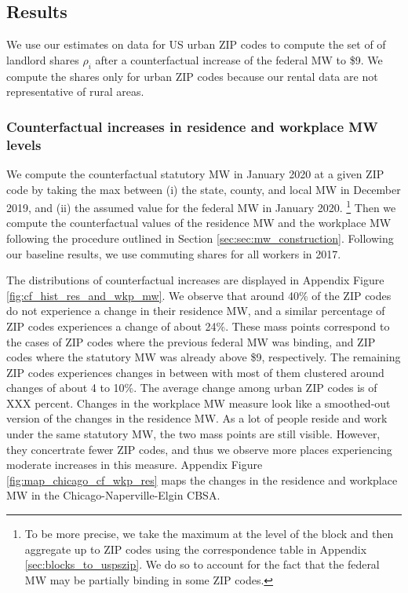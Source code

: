 \subsection{Results}\label{sec:results_cf}

We use our estimates on data for US urban ZIP codes to compute the set of
of landlord shares ${\rho_i}$ after a counterfactual increase of the federal 
MW to \$9.
We compute the shares only for urban ZIP codes because our rental data are not 
representative of rural areas.

\subsubsection*{Counterfactual increases in residence and workplace MW levels}
\label{sec:cf_res_and_wkp_changes}

We compute the counterfactual statutory MW in January 2020 at a given ZIP code 
by taking the max between (i) the state, county, and local MW in December 2019, 
and (ii) the assumed value for the federal MW in January 2020.%
\footnote{To be more precise, we take the maximum at the level of the block and 
then aggregate up to ZIP codes using the correspondence table in Appendix 
\ref{sec:blocks_to_uspszip}.
We do so to account for the fact that the federal MW may be partially binding
in some ZIP codes.}
Then we compute the counterfactual values of the residence MW and the workplace
MW following the procedure outlined in Section \ref{sec:sec:mw_construction}.
Following our baseline results, we use commuting shares for all workers in
2017.

The distributions of counterfactual increases are displayed in Appendix
Figure \ref{fig:cf_hist_res_and_wkp_mw}.
We observe that around 40\% of the ZIP codes do not experience a change 
in their residence MW, and a similar percentage of ZIP codes experiences a
change of about 24\%.
These mass points correspond to the cases of ZIP codes where the previous 
federal MW was binding, and ZIP codes where the statutory MW was already 
above \$9, respectively.
The remaining ZIP codes experiences changes in between with most of them
clustered around changes of about 4 to 10\%.
The average change among urban ZIP codes is of XXX percent.
Changes in the workplace MW measure look like a smoothed-out version of
the changes in the residence MW.
As a lot of people reside and work under the same statutory MW, the two mass
points are still visible.
However, they concertrate fewer ZIP codes, and thus we observe more places 
experiencing moderate increases in this measure.
Appendix Figure \ref{fig:map_chicago_cf_wkp_res} maps the changes in the 
residence and workplace MW in the Chicago-Naperville-Elgin CBSA.

